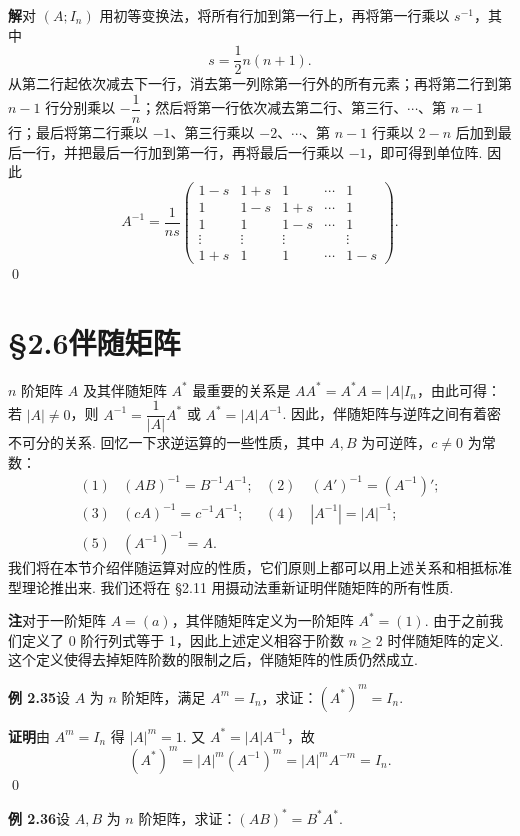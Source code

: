 \documentclass[UTF8, 12pt, fontset=fandol, oneside]{ctexart}
\begin{document}
\noindent\textbf{解}\quad 对 $(A;I_n)$ 用初等变换法，将所有行加到第一行上，再将第一行乘以 $s^{-1}$，其中
\[
s=\frac12 n(n+1).
\]
从第二行起依次减去下一行，消去第一列除第一行外的所有元素；再将第二行到第 $n-1$ 行分别乘以 $-\dfrac1n$；然后将第一行依次减去第二行、第三行、$\cdots$、第 $n-1$ 行；最后将第二行乘以 $-1$、第三行乘以 $-2$、$\cdots$、第 $n-1$ 行乘以 $2-n$ 后加到最后一行，并把最后一行加到第一行，再将最后一行乘以 $-1$，即可得到单位阵. 因此
\[
A^{-1}=\frac1{ns}
\left(
\begin{array}{ccccc}
1-s & 1+s & 1 & \cdots & 1\\
1 & 1-s & 1+s & \cdots & 1\\
1 & 1 & 1-s & \cdots & 1\\
\vdots & \vdots & \vdots & & \vdots\\
1+s & 1 & 1 & \cdots & 1-s
\end{array}
\right).
\]
\qed

\section*{§2.6\quad 伴随矩阵}

$n$ 阶矩阵 $A$ 及其伴随矩阵 $A^*$ 最重要的关系是 $AA^*=A^*A=|A|I_n$，由此可得：若 $|A|\ne0$，则 $A^{-1}=\dfrac1{|A|}A^*$ 或 $A^*=|A|A^{-1}$. 因此，伴随矩阵与逆阵之间有着密不可分的关系. 回忆一下求逆运算的一些性质，其中 $A,B$ 为可逆阵，$c\ne0$ 为常数：
\[
\begin{array}{lll}
(1) & (AB)^{-1}=B^{-1}A^{-1}; &
(2)\quad (A')^{-1}=(A^{-1})';\\
(3) & (cA)^{-1}=c^{-1}A^{-1}; &
(4)\quad |A^{-1}|=|A|^{-1};\\
(5) & (A^{-1})^{-1}=A.
\end{array}
\]
我们将在本节介绍伴随运算对应的性质，它们原则上都可以用上述关系和相抵标准型理论推出来. 我们还将在 §2.11 用摄动法重新证明伴随矩阵的所有性质.

\noindent\textbf{注}\quad 对于一阶矩阵 $A=(a)$，其伴随矩阵定义为一阶矩阵 $A^*=(1)$. 由于之前我们定义了 0 阶行列式等于 1，因此上述定义相容于阶数 $n\ge2$ 时伴随矩阵的定义. 这个定义使得去掉矩阵阶数的限制之后，伴随矩阵的性质仍然成立.

\noindent\textbf{例 2.35}\quad 设 $A$ 为 $n$ 阶矩阵，满足 $A^m=I_n$，求证：$(A^*)^m=I_n$.

\noindent\textbf{证明}\quad 由 $A^m=I_n$ 得 $|A|^m=1$. 又 $A^*=|A|A^{-1}$，故
\[
(A^*)^m=|A|^m(A^{-1})^m=|A|^mA^{-m}=I_n.
\]
\qed

\noindent\textbf{例 2.36}\quad 设 $A,B$ 为 $n$ 阶矩阵，求证：$(AB)^*=B^*A^*$.
\end{document}

